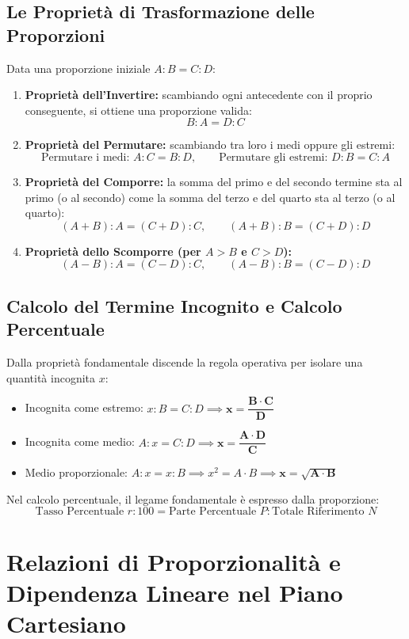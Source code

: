 \documentclass[11pt,a4paper,oneside]{report}
\begin{document}
\section{Le Proprietà di Trasformazione delle Proporzioni}
Data una proporzione iniziale $A : B = C : D$:
\begin{enumerate}
  \item \textbf{Proprietà dell'Invertire:} scambiando ogni antecedente con il proprio conseguente, si ottiene una proporzione valida:
  \[
  B : A = D : C
  \]
  \item \textbf{Proprietà del Permutare:} scambiando tra loro i medi oppure gli estremi:
  \[
  \text{Permutare i medi: } A : C = B : D, \qquad \text{Permutare gli estremi: } D : B = C : A
  \]
  \item \textbf{Proprietà del Comporre:} la somma del primo e del secondo termine sta al primo (o al secondo) come la somma del terzo e del quarto sta al terzo (o al quarto):
  \[
  (A + B) : A = (C + D) : C, \qquad (A + B) : B = (C + D) : D
  \]
  \item \textbf{Proprietà dello Scomporre (per $A > B$ e $C > D$):}
  \[
  (A - B) : A = (C - D) : C, \qquad (A - B) : B = (C - D) : D
  \]
\end{enumerate}

\section{Calcolo del Termine Incognito e Calcolo Percentuale}
Dalla proprietà fondamentale discende la regola operativa per isolare una quantità incognita $x$:
\begin{itemize}
  \item Incognita come estremo: $x : B = C : D \implies \mathbf{x = \dfrac{B \cdot C}{D}}$
  \item Incognita come medio: $A : x = C : D \implies \mathbf{x = \dfrac{A \cdot D}{C}}$
  \item Medio proporzionale: $A : x = x : B \implies x^2 = A \cdot B \implies \mathbf{x = \sqrt{A \cdot B}}$
\end{itemize}
Nel calcolo percentuale, il legame fondamentale è espresso dalla proporzione:
\[
\text{Tasso Percentuale } r : 100 = \text{Parte Percentuale } P : \text{Totale Riferimento } N
\]

\chapter{Relazioni di Proporzionalità e Dipendenza Lineare nel Piano Cartesiano}
\end{document}
